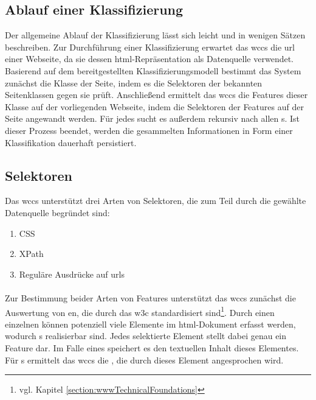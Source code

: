     \subsection{Ablauf einer Klassifizierung}
        \label{section:solutionConceptClassificationAlg}
        Der allgemeine Ablauf der Klassifizierung lässt sich leicht und in wenigen Sätzen beschreiben.
        Zur Durchführung einer Klassifizierung erwartet das \gls{wccs} die \gls{url} einer Webseite,
        da sie dessen \gls{html}-Repräsentation als Datenquelle verwendet.
        Basierend auf dem bereitgestellten Klassifizierungsmodell
        bestimmt das System zunächst die Klasse der Seite,
        indem es die Selektoren der bekannten Seitenklassen gegen sie prüft.
        Anschließend ermittelt das \gls{wccs} die Features dieser Klasse auf der vorliegenden Webseite,
        indem die Selektoren der Features auf der Seite angewandt werden.
        Für jedes {\contentFeature} sucht es außerdem rekursiv nach allen {\childFeature}s.
        Ist dieser Prozess beendet, werden die gesammelten Informationen in Form einer Klassifikation
        dauerhaft persistiert.

    \subsection{Selektoren}
        \label{section:conceptSupportedSelectors}
        Das \gls{wccs} unterstützt drei Arten von Selektoren,
        die zum Teil durch die gewählte Datenquelle begründet sind:

        \begin{enumerate}
            \item CSS
            \item XPath
            \item Reguläre Ausdrücke auf \glspl{url}
        \end{enumerate}

        \paragraph{\cssSelector}
        Zur Bestimmung beider Arten von Features unterstützt das \gls{wccs} zunächst
        die Auswertung von {\cssSelector}en, die durch das \gls{w3c} standardisiert
        sind\footnote{vgl. Kapitel \ref{section:wwwTechnicalFoundations}}.
        Durch einen einzelnen {\cssSelector} können potenziell viele Elemente im \gls{html}-Dokument
        erfasst werden, wodurch {\collectionFeature}s realisierbar sind.
        Jedes selektierte Element stellt dabei genau ein Feature dar.
        Im Falle eines {\contentFeature} speichert es den textuellen Inhalt dieses Elementes.
        Für {}s ermittelt das \gls{wccs} die {\resource},
        die durch dieses Element angesprochen wird.

